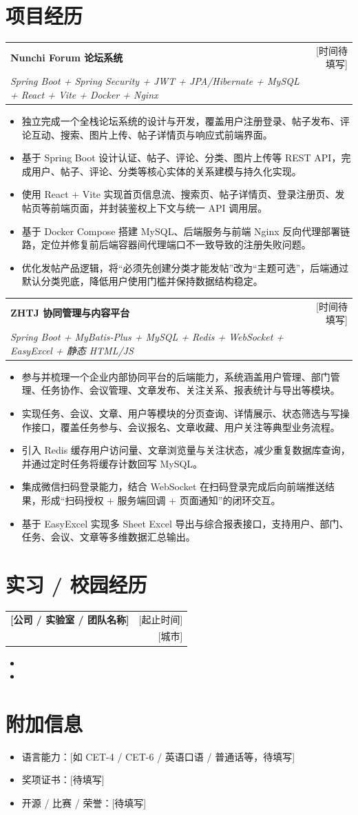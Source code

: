 \documentclass[11pt,a4paper]{ctexart}
\newcommand{\resumeSubheading}[4]{
  \begin{tabularx}{\textwidth}{Xr}
    \textbf{#1} & #2 \\
    #3 & #4 \\
  \end{tabularx}
}
\newcommand{\resumeProject}[3]{
  \begin{tabularx}{\textwidth}{Xr}
    \textbf{#1} & #2 \\
    \textit{#3} & \\
  \end{tabularx}
}
\begin{document}
\section*{项目经历}
\resumeProject
  {Nunchi Forum 论坛系统}{[时间待填写]}
  {Spring Boot + Spring Security + JWT + JPA/Hibernate + MySQL + React + Vite + Docker + Nginx}
\begin{itemize}
  \item 独立完成一个全栈论坛系统的设计与开发，覆盖用户注册登录、帖子发布、评论互动、搜索、图片上传、帖子详情页与响应式前端界面。
  \item 基于 Spring Boot 设计认证、帖子、评论、分类、图片上传等 REST API，完成用户、帖子、评论、分类等核心实体的关系建模与持久化实现。
  \item 使用 React + Vite 实现首页信息流、搜索页、帖子详情页、登录注册页、发帖页等前端页面，并封装鉴权上下文与统一 API 调用层。
  \item 基于 Docker Compose 搭建 MySQL、后端服务与前端 Nginx 反向代理部署链路，定位并修复前后端容器间代理端口不一致导致的注册失败问题。
  \item 优化发帖产品逻辑，将“必须先创建分类才能发帖”改为“主题可选”，后端通过默认分类兜底，降低用户使用门槛并保持数据结构稳定。
\end{itemize}

\resumeProject
  {ZHTJ 协同管理与内容平台}{[时间待填写]}
  {Spring Boot + MyBatis-Plus + MySQL + Redis + WebSocket + EasyExcel + 静态 HTML/JS}
\begin{itemize}
  \item 参与并梳理一个企业内部协同平台的后端能力，系统涵盖用户管理、部门管理、任务协作、会议管理、文章发布、关注关系、报表统计与导出等模块。
  \item 实现任务、会议、文章、用户等模块的分页查询、详情展示、状态筛选与写操作接口，覆盖任务参与、会议报名、文章收藏、用户关注等典型业务流程。
  \item 引入 Redis 缓存用户访问量、文章浏览量与关注状态，减少重复数据库查询，并通过定时任务将缓存计数回写 MySQL。
  \item 集成微信扫码登录能力，结合 WebSocket 在扫码登录完成后向前端推送结果，形成“扫码授权 + 服务端回调 + 页面通知”的闭环交互。
  \item 基于 EasyExcel 实现多 Sheet Excel 导出与综合报表接口，支持用户、部门、任务、会议、文章等多维数据汇总输出。
\end{itemize}

\section*{实习 / 校园经历}
\resumeSubheading
  {[公司 / 实验室 / 团队名称]}{[起止时间]}
  {[岗位名称]}{[城市]}
\begin{itemize}
  \item [占位：描述你的实习、实验室、工作室或项目组经历]
  \item [占位：补充技术栈、职责边界、结果或量化影响]
\end{itemize}

\section*{附加信息}
\begin{itemize}
  \item 语言能力：[如 CET-4 / CET-6 / 英语口语 / 普通话等，待填写]
  \item 奖项证书：[待填写]
  \item 开源 / 比赛 / 荣誉：[待填写]
\end{itemize}
\end{document}
